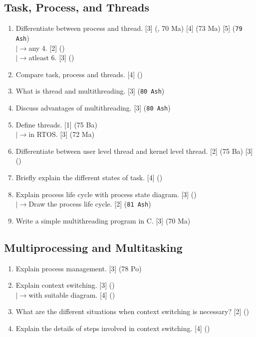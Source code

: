 \documentclass[12pt]{article}
\newcommand{\lb}{\\$\left|\rightarrow\right.$}
\begin{document}
  \subsection{Task, Process, and Threads}
    \begin{enumerate}
      \item Differentiate between process and thread. \hfill [3] (, 70 Ma) [4] (73 Ma) [5] (\texttt{79 Ash})
      \lb any 4. \hfill [2] ()
      \lb atleast 6. \hfill [3] ()

      \item Compare task, process and threads. \hfill [4] ()

      \item What is thread and multithreading. \hfill [3] (\texttt{80 Ash})

      \item Discuss advantages of multithreading. \hfill [3] (\texttt{80 Ash})

      \item Define threads. \hfill [1] (75 Ba)
      \lb in RTOS. \hfill [3] (72 Ma)

      \item Differentiate between user level thread and kernel level thread. \hfill [2] (75 Ba) [3] ()

      \item Briefly explain the different states of task. \hfill [4] ()

      \item Explain process life cycle with process state diagram. \hfill [3] ()
        \lb Draw the process life cycle. \hfill [2] (\texttt{81 Ash})

      \item Write a simple multithreading program in C. \hfill [3] (70 Ma)
    \end{enumerate}

  \subsection{Multiprocessing and Multitasking}
    \begin{enumerate}
      \item Explain process management. \hfill [3] (78 Po)
        
      \item Explain context switching. \hfill [3] ()
      \lb with suitable diagram. \hfill [4] ()

      \item What are the different situations when context switching is necessary? \hfill [2] ()

      \item Explain the details of steps involved in context switching. \hfill [4] ()
    \end{enumerate}
\end{document}
